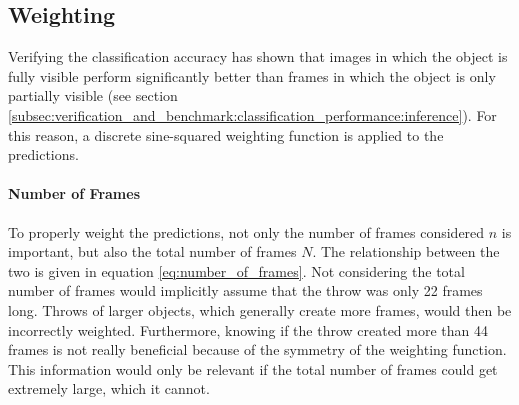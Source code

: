 








\subsection{Weighting}
\label{subsec:inference:app:weighting}

Verifying the classification accuracy has shown that images in which the object is fully visible perform significantly better than frames in which the object is only partially visible (see section \ref{subsec:verification_and_benchmark:classification_performance:inference}). %
For this reason, a discrete sine-squared weighting function is applied to the predictions.

\paragraph{Number of Frames}
To properly weight the predictions, not only the number of frames considered $n$ is important, but also the total number of frames $N$.
The relationship between the two is given in equation \ref{eq:number_of_frames}.
Not considering the total number of frames would implicitly assume that the throw was only \num{22} frames long.
Throws of larger objects, which generally create more frames, would then be incorrectly weighted.
Furthermore, knowing if the throw created more than \num{44} frames is not really beneficial because of the symmetry of the weighting function.
This information would only be relevant if the total number of frames could get extremely large, which it cannot.

